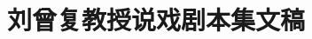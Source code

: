 \documentclass[12pt, oneside, AutoFakeBold, a4paper]{article}      %
\title{\hei\Huge{刘曾复教授说戏剧本集文稿}}
\author[]{}   %
\date{} %
\begin{document}
%
\renewcommand{\abstractname}{\small{\CJKfamily{hei} 摘\quad 要}} %
\renewcommand{\contentsname}{\centering\CJKfamily{hei} 目~~~录}
\renewcommand{\refname}{\centering\CJKfamily{hei} 主~要~参~考~资~料}
\renewcommand{\figurename}{}
\renewcommand{\tablename}{{\bf Tab}.}


\newcommand{\keywords}[1]{{\hspace{0pt}\small{\CJKfamily{hei} 关键词:}{\hspace{2ex}{#1}}\bigskip}}



\end{document}
